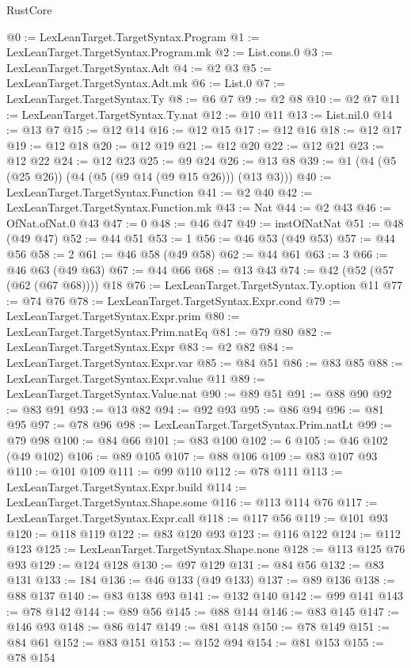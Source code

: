 \begin{lexlean}{RustCore}
\begin{coremodule}
@0 := LexLeanTarget.TargetSyntax.Program
@1 := LexLeanTarget.TargetSyntax.Program.mk
@2 := List.cons.{0}
@3 := LexLeanTarget.TargetSyntax.Adt
@4 := @2 @3
@5 := LexLeanTarget.TargetSyntax.Adt.mk
@6 := List.{0}
@7 := LexLeanTarget.TargetSyntax.Ty
@8 := @6 @7
@9 := @2 @8
@10 := @2 @7
@11 := LexLeanTarget.TargetSyntax.Ty.nat
@12 := @10 @11
@13 := List.nil.{0}
@14 := @13 @7
@15 := @12 @14
@16 := @12 @15
@17 := @12 @16
@18 := @12 @17
@19 := @12 @18
@20 := @12 @19
@21 := @12 @20
@22 := @12 @21
@23 := @12 @22
@24 := @12 @23
@25 := @9 @24
@26 := @13 @8
@39 := @1 (@4 (@5 (@25 @26)) (@4 (@5 (@9 @14 (@9 @15 @26))) (@13 @3)))
@40 := LexLeanTarget.TargetSyntax.Function
@41 := @2 @40
@42 := LexLeanTarget.TargetSyntax.Function.mk
@43 := Nat
@44 := @2 @43
@46 := OfNat.ofNat.{0} @43
@47 := 0
@48 := @46 @47
@49 := instOfNatNat
@51 := @48 (@49 @47)
@52 := @44 @51
@53 := 1
@56 := @46 @53 (@49 @53)
@57 := @44 @56
@58 := 2
@61 := @46 @58 (@49 @58)
@62 := @44 @61
@63 := 3
@66 := @46 @63 (@49 @63)
@67 := @44 @66
@68 := @13 @43
@74 := @42 (@52 (@57 (@62 (@67 @68)))) @18
@76 := LexLeanTarget.TargetSyntax.Ty.option @11
@77 := @74 @76
@78 := LexLeanTarget.TargetSyntax.Expr.cond
@79 := LexLeanTarget.TargetSyntax.Expr.prim
@80 := LexLeanTarget.TargetSyntax.Prim.natEq
@81 := @79 @80
@82 := LexLeanTarget.TargetSyntax.Expr
@83 := @2 @82
@84 := LexLeanTarget.TargetSyntax.Expr.var
@85 := @84 @51
@86 := @83 @85
@88 := LexLeanTarget.TargetSyntax.Expr.value @11
@89 := LexLeanTarget.TargetSyntax.Value.nat
@90 := @89 @51
@91 := @88 @90
@92 := @83 @91
@93 := @13 @82
@94 := @92 @93
@95 := @86 @94
@96 := @81 @95
@97 := @78 @96
@98 := LexLeanTarget.TargetSyntax.Prim.natLt
@99 := @79 @98
@100 := @84 @66
@101 := @83 @100
@102 := 6
@105 := @46 @102 (@49 @102)
@106 := @89 @105
@107 := @88 @106
@109 := @83 @107 @93
@110 := @101 @109
@111 := @99 @110
@112 := @78 @111
@113 := LexLeanTarget.TargetSyntax.Expr.build
@114 := LexLeanTarget.TargetSyntax.Shape.some
@116 := @113 @114 @76
@117 := LexLeanTarget.TargetSyntax.Expr.call
@118 := @117 @56
@119 := @101 @93
@120 := @118 @119
@122 := @83 @120 @93
@123 := @116 @122
@124 := @112 @123
@125 := LexLeanTarget.TargetSyntax.Shape.none
@128 := @113 @125 @76 @93
@129 := @124 @128
@130 := @97 @129
@131 := @84 @56
@132 := @83 @131
@133 := 184
@136 := @46 @133 (@49 @133)
@137 := @89 @136
@138 := @88 @137
@140 := @83 @138 @93
@141 := @132 @140
@142 := @99 @141
@143 := @78 @142
@144 := @89 @56
@145 := @88 @144
@146 := @83 @145
@147 := @146 @93
@148 := @86 @147
@149 := @81 @148
@150 := @78 @149
@151 := @84 @61
@152 := @83 @151
@153 := @152 @94
@154 := @81 @153
@155 := @78 @154

\end{coremodule}
\end{lexlean}
